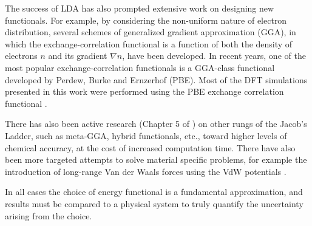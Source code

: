 The success of LDA has also prompted extensive work on designing new functionals. For
example, by considering the non-uniform nature of electron distribution, several
schemes of generalized gradient approximation (GGA), in which the
exchange-correlation functional is a function of both the density of electrons $n$
and its gradient $\nabla n$, have been developed. In recent years, one of the most
popular exchange-correlation functionals is a GGA-class functional developed by
Perdew, Burke and Ernzerhof \citep{Perdew1996} (PBE). Most of the DFT simulations
presented in this work were performed using the PBE exchange correlation functional .

There has also been active research (Chapter 5 of \cite{martin-esbook}) on other
rungs of the Jacob's Ladder, such as meta-GGA, hybrid functionals, etc., toward
higher levels of chemical accuracy, at the cost of increased computation time. There
have also been more targeted attempts to solve material specific problems, for
example the introduction of long-range Van der Waals forces using the VdW potentials
\citep{Raymond2015}.

In all cases the choice of energy functional is a fundamental approximation, and
results must be compared to a physical system to truly quantify the uncertainty 
arising from the choice.

